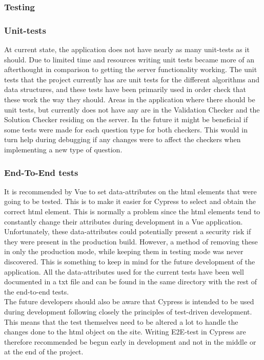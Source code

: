 \subsubsection{Testing}
\subsubsection{Unit-tests}
At current state, the application does not have nearly as many unit-tests as it should. Due to limited time and resources writing unit tests became more of an afterthought in comparison to getting the server functionality working. The unit tests that the project currently has are unit tests for the different algorithms and data structures, and these tests have been primarily used in order check that these work the way they should. Areas in the application where there should be unit tests, but currently does not have any are in the Validation Checker and the Solution Checker residing on the server. In the future it might be beneficial if some tests were made for each question type for both checkers. This would in turn help during debugging if any changes were to affect the checkers when implementing a new type of question.
\subsubsection{End-To-End tests}
It is recommended by Vue to set data-attributes on the html elements that were going to be tested. This is to make it easier for Cypress to select and obtain the correct html element. This is normally a problem since the html elements tend to constantly change their attributes during development in a Vue application. Unfortunately, these data-attributes could potentially present a security risk if they were present in the production build. However, a method of removing these in only the production mode, while keeping them in testing mode was never discovered. This is something to keep in mind for the future development of the application. All the data-attributes used for the current tests have been well documented in a txt file and can be found in the same directory with the rest of the end-to-end tests.\cite{Cypress:BestPractise}\\[11pt] 
The future developers should also be aware that Cypress is intended to be used during development following closely the principles of test-driven development. This means that the test themselves need to be altered a lot to handle the changes done to the html object on the site. Writing E2E-test in Cypress are therefore recommended be begun early in development and not in the middle or at the end of the project.

